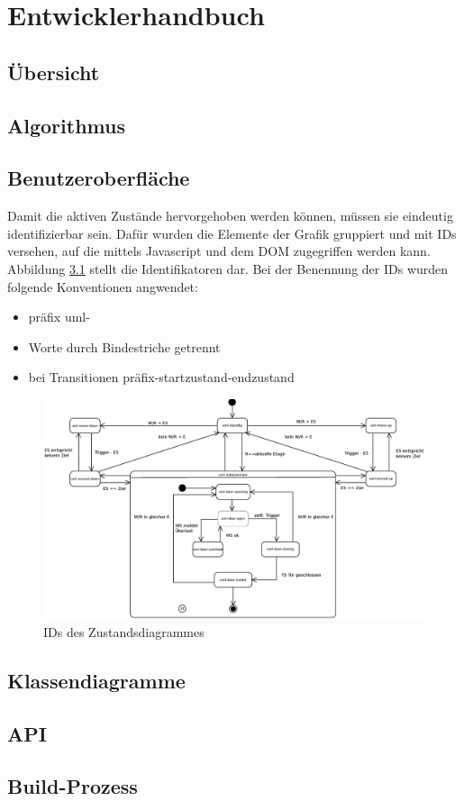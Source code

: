 \part{Entwicklerhandbuch}

\chapter{Übersicht}
\chapter{Algorithmus}
\chapter{Benutzeroberfläche}
Damit die aktiven Zustände hervorgehoben werden können, müssen sie eindeutig identifizierbar sein. Dafür wurden die Elemente der Grafik gruppiert und mit IDs versehen, auf die mittels Javascript und dem DOM zugegriffen werden kann. Abbildung \ref{fig:ZD_id_view} stellt die Identifikatoren dar. Bei der Benennung der IDs wurden folgende Konventionen angwendet:
\begin{itemize}
 \item präfix uml-
 \item Worte durch Bindestriche getrennt
 \item bei Transitionen präfix-startzustand-endzustand
\end{itemize}

\begin{figure}[hbt]
\centering
\includegraphics[width=\textwidth]{images/ZDv6_id_view.eps}
\caption{IDs des Zustandsdiagrammes}%
\label{fig:ZD_id_view}%
\end{figure}
\chapter{Klassendiagramme}
\chapter{API}
\chapter{Build-Prozess}
